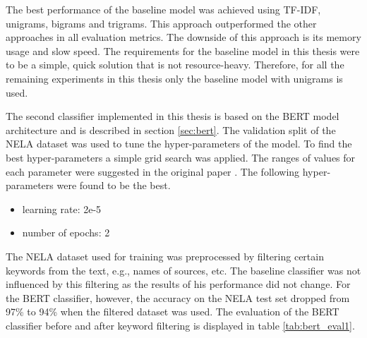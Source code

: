 The best performance of the baseline model was achieved using TF-IDF, unigrams, bigrams and trigrams. This approach outperformed the other approaches in all evaluation metrics. The downside of this approach is its memory usage and slow speed. The requirements for the baseline model in this thesis were to be a simple, quick solution that is not resource-heavy. Therefore, for all the remaining experiments in this thesis only the baseline model with unigrams is used.

The second classifier implemented in this thesis is based on the BERT model architecture and is described in section \ref{sec:bert}. The validation split of the NELA dataset was used to tune the hyper-parameters of the model. To find the best hyper-parameters a simple grid search was applied. The ranges of values for each parameter were suggested in the original paper \cite{bert}. The following hyper-parameters were found to be the best.

\begin{itemize}
    \item learning rate: 2e-5
    \item number of epochs: 2
\end{itemize}

The NELA dataset used for training was preprocessed by filtering certain keywords from the text, e.g., names of sources, etc. The baseline classifier was not influenced by this filtering as the results of his performance did not change. For the BERT classifier, however, the accuracy on the NELA test set dropped from 97\% to 94\% when the filtered dataset was used. The evaluation of the BERT classifier before and after keyword filtering is displayed in table \ref{tab:bert_eval1}.

